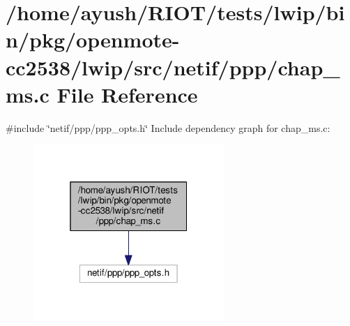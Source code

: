 \hypertarget{openmote-cc2538_2lwip_2src_2netif_2ppp_2chap__ms_8c}{}\section{/home/ayush/\+R\+I\+O\+T/tests/lwip/bin/pkg/openmote-\/cc2538/lwip/src/netif/ppp/chap\+\_\+ms.c File Reference}
\label{openmote-cc2538_2lwip_2src_2netif_2ppp_2chap__ms_8c}
{\ttfamily \#include \char`\"{}netif/ppp/ppp\+\_\+opts.\+h\char`\"{}}\newline
Include dependency graph for chap\+\_\+ms.\+c\+:
\nopagebreak
\begin{figure}[H]
\begin{center}
\leavevmode
\includegraphics[width=205pt]{openmote-cc2538_2lwip_2src_2netif_2ppp_2chap__ms_8c__incl}
\end{center}
\end{figure}

